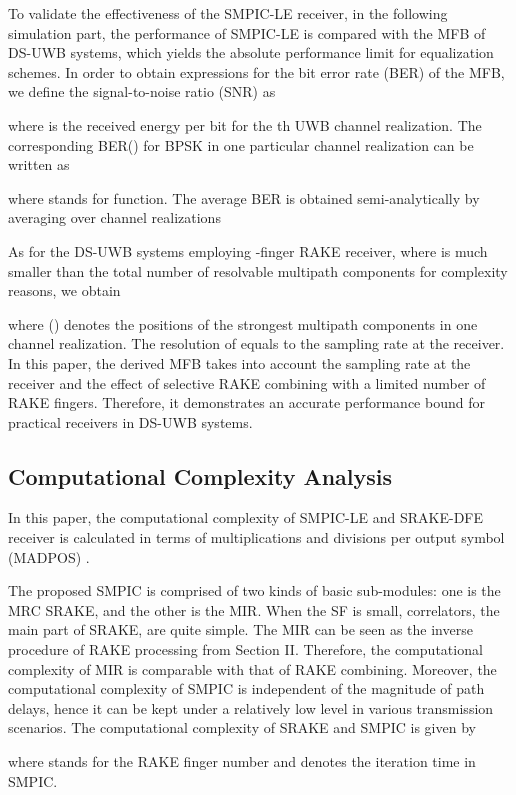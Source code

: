\documentclass[journal]{IEEEtran}
\begin{document}
To validate the effectiveness of the SMPIC-LE receiver, in the
following simulation part, the performance of SMPIC-LE is compared
with the MFB of DS-UWB systems, which yields the absolute
performance limit for equalization schemes. In order to obtain
expressions for the bit error rate (BER) of the MFB, we define the
signal-to-noise ratio (SNR) as

where  is the received energy per bit for the th UWB
channel realization. The corresponding BER() for BPSK in
one particular channel realization can be written as

where  stands for  function. The average BER is obtained
semi-analytically by averaging over  channel realizations

As for the DS-UWB systems employing -finger RAKE receiver, where
 is much smaller than the total number of resolvable multipath
components for complexity reasons, we obtain

where  () denotes the positions of the
strongest  multipath components in one channel realization. The
resolution of  equals to the sampling rate at the receiver. In
this paper, the derived MFB takes into account the sampling rate at
the receiver and the effect of selective RAKE combining with a
limited number of RAKE fingers. Therefore, it demonstrates an
accurate performance bound for practical receivers in DS-UWB
systems.

\subsection{Computational Complexity Analysis}




In this paper, the computational complexity of SMPIC-LE and
SRAKE-DFE receiver is calculated in terms of multiplications and
divisions per output symbol (MADPOS) \cite{Proakis}.

The proposed SMPIC is comprised of two kinds of basic sub-modules:
one is the MRC SRAKE, and the other is the MIR. When the SF is
small, correlators, the main part of SRAKE, are quite simple. The
MIR can be seen as the inverse procedure of RAKE processing from
Section II. Therefore, the computational complexity of MIR is
comparable with that of RAKE combining. Moreover, the computational
complexity of SMPIC is independent of the magnitude of path delays,
hence it can be kept under a relatively low level in various
transmission scenarios. The computational complexity of SRAKE and
SMPIC is given by


where  stands for the RAKE finger number and  denotes the
iteration time in SMPIC.
\end{document}
